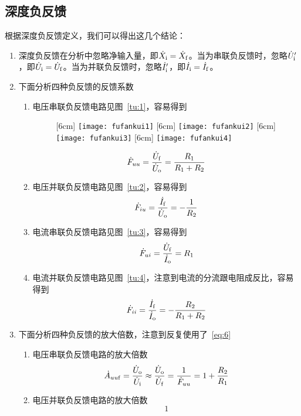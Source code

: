\documentclass[cn,pad,11pt,geye]{elegantnote}
\begin{document}
\subsection{深度负反馈}
根据深度负反馈定义，我们可以得出这几个结论：
\begin{enumerate}
	\item 深度负反馈在分析中忽略净输入量，即$\dot{X}_{\rm{i}}=\dot{X}_{\rm{f}}\label{eq:6}$。当为串联负反馈时，忽略$\dot{U}_{\rm{i}}'$，即$\dot{U}_{\rm{i}}=\dot{U}_{\rm{f}}$。当为并联负反馈时，忽略$\dot{I}_{\rm{i}}'$，即$\dot{I}_{\rm{i}}=\dot{I}_{\rm{f}}$。
	\item 下面分析四种负反馈的反馈系数
	\begin{enumerate}
		\item 电压串联负反馈电路见图~\ref{tu:1}，容易得到
		\begin{figure}[ht]
			\centering
			[6cm]{
				\texttt{[image: fufankui1]}}
			[6cm]{
			    \texttt{[image: fufankui2]}}
			[6cm]{
				\texttt{[image: fufankui3]}}
			[6cm]{
				\texttt{[image: fufankui4]}}
		\end{figure}
		\begin{equation*}
			\dot{F}_{uu}=\frac{\dot{U}_{\rm{f}}}{\dot{U}_{\rm{o}}}=\frac{R_1}{R_1+R_2}
		\end{equation*}
		\item 电压并联负反馈电路见图~\ref{tu:2}，容易得到
		\begin{equation*}
			\dot{F}_{iu}=\frac{\dot{I}_{\rm{f}}}{\dot{U}_{\rm{o}}}=-\frac{1}{R_2}
		\end{equation*}
		\item 电流串联负反馈电路见图~\ref{tu:3}，容易得到
		\begin{equation*}
			\dot{F}_{ui}=\frac{\dot{U}_{\rm{f}}}{\dot{I}_{\rm{o}}}=R_1
		\end{equation*}
		\item 电流并联负反馈电路见图~\ref{tu:4}，注意到电流的分流跟电阻成反比，容易得到
		\begin{equation*}
			\dot{F}_{ii}=\frac{\dot{I}_{\rm{f}}}{\dot{I}_{\rm{o}}}=-\frac{R_2}{R_1+R_2}
		\end{equation*}
	\end{enumerate}
    \item 下面分析四种负反馈的放大倍数，注意到反复使用了~\ref{eq:6}
    \begin{enumerate}
    	\item 电压串联负反馈电路的放大倍数
    	\begin{equation*}
    		\dot{A}_{uu\rm{f}}=\frac{\dot{U}_{\rm{o}}}{\dot{U}_{\rm{i}}}\approx\frac{\dot{U}_{\rm{o}}}{\dot{U}_{\rm{f}}}=\frac{1}{\dot{F}_{uu}}=1+\frac{R_2}{R_1}
    	\end{equation*}
    	\item 电压并联负反馈电路的放大倍数
    	\begin{equation*}
    		1
    	\end{equation*}
    \end{enumerate}
\end{enumerate}
\end{document}
